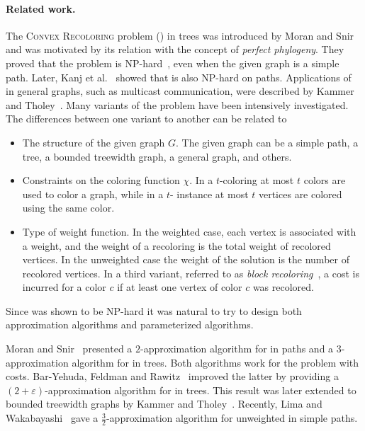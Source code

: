\paragraph*{Related work.}
%
The \textsc{Convex Recoloring} problem (\CRP{}) in trees was
introduced by Moran and Snir~\cite{MoranSnir08} and was motivated by
its relation with the concept of \emph{perfect phylogeny}.  They
proved that the problem is NP-hard~\cite{kanj2009convex}, even when
the given graph is a simple path.  Later, Kanj et
al.~\cite{kanj2009convex} showed that \TWOCR{} is also NP-hard on
paths.
%
Applications of \CRP{} in general graphs, 
such as multicast communication, 
were described by Kammer and Tholey~\cite{kammer2012complexity}.
%
Many variants of the problem have been intensively investigated.
%
The differences between one variant to another can be related to
%
\begin{itemize}
\item The structure of the given graph $G$.
%
The given graph can be a simple path, 
a tree,
a bounded treewidth graph, 
a general graph, 
and others.
  
\item Constraints on the coloring function $\chi$.
%
In a $t$-coloring at most $t$ colors are used to color a graph,
while in a $t$-\CRP{} instance at most $t$ vertices are colored using the same color.

\item Type of weight function.
%
In the weighted case, 
each vertex is associated with a weight,
and the weight of a recoloring is the total weight of recolored vertices.
%
In the unweighted case the weight of the solution is the number of recolored vertices.
%
In a third variant, 
referred to as \emph{block recoloring}~\cite{kammer2012complexity}, 
a cost is incurred for a color $c$ if at least one vertex of color $c$ was recolored. 
\end{itemize}
%
Since \CRP{} was shown to be NP-hard it was natural to try to design both
approximation algorithms and parameterized algorithms.


Moran and Snir~\cite{moran2007efficient} presented a $2$-approximation
algorithm for \CRP{} in paths and a $3$-approximation algorithm for \CRP{}
in trees.  
%
Both algorithms work for the problem with costs.
%
Bar-Yehuda, Feldman and Rawitz~\cite{BFR08} improved the
latter by providing a $(2+\varepsilon)$-approximation algorithm for
\CRP{} in trees.  
%
This result was later extended to bounded treewidth graphs by 
Kammer and Tholey~\cite{kammer2012complexity}.
%
Recently, Lima and Wakabayashi~\cite{lima2014convex} gave a 
$\frac{3}{2}$-approximation algorithm for unweighted \TWOCR{} in simple paths.


